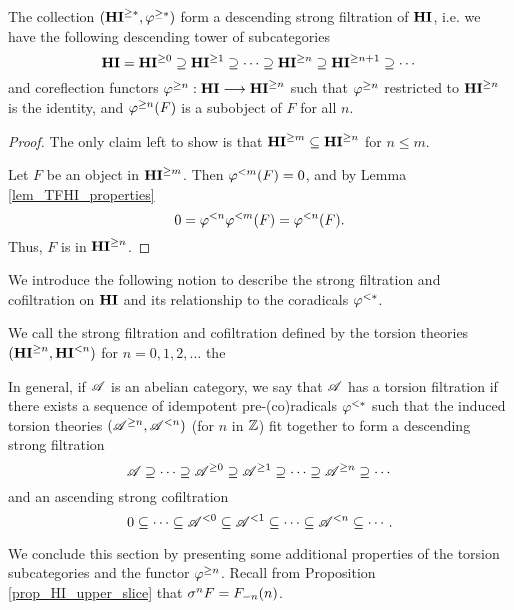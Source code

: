 \begin{prop}\label{prop_THI_form_strong_filt}
The collection $(\THI{*}, \tgHI{*})$ form a descending strong 
filtration of $\HI$, i.e. we have the following descending
tower of subcategories
\[
\HI = \THI{0} \supseteq \THI{1} \supseteq \cdots \supseteq \THI{n} \supseteq \THI{n + 1}
\supseteq \cdots
\]
and coreflection functors $\tgHI{n} : \HI \to \THI{n}$ such
that $\tgHI{n}$ restricted to $\THI{n}$ is the identity, and
$\tgHI{n}(F)$ is a subobject of $F$ for all $n$.
\end{prop}
\begin{proof}
The only claim left to show is that $\THI{m} \subseteq \THI{n}$
for $n \leq m$.

Let $F$ be an object in $\THI{m}$. Then 
$\tlHI{m}(F) = 0$, and by Lemma \ref{lem_TFHI_properties}
\[
0 = \tlHI{n}\tlHI{m}(F) = \tlHI{n}(F).
\]
Thus, $F$ is in $\THI{n}$.
\end{proof}

We introduce the following notion to describe the strong filtration
and cofiltration on $\HI$ and its relationship to the coradicals
$\tlHI{*}$.

\begin{defn}
We call the strong filtration and cofiltration defined by
the torsion theories $(\TGHI{n}{\HI}, \TLHI{n}{\HI})$ for $n = 
0,1,2,\dots$ the 

In general, if $\Cat{A}$ is an abelian category, we say that
$\Cat{A}$ has a torsion filtration if there exists a sequence
of idempotent pre-(co)radicals $\corad{*}$ such that the induced
torsion theories $(\Prerad{n}{\Cat{A}}, \Corad{n}{\Cat{A}})$ (for 
$n$ in $\Z$) fit together to form a descending strong filtration
\[
\Cat{A} \supseteq \cdots \supseteq \Prerad{0}{\Cat{A}} \supseteq
   \Prerad{1}{\Cat{A}} \supseteq \cdots \supseteq \Prerad{n}{\Cat{A}}
   \supseteq \cdots
\]
and an ascending strong cofiltration
\[
0 \subseteq \cdots \subseteq \Corad{0}{\Cat{A}} \subseteq
   \Corad{1}{\Cat{A}} \subseteq \cdots \subseteq \Corad{n}{\Cat{A}}
   \subseteq \cdots.
\]
\end{defn}

We conclude this section by presenting some additional properties of
the torsion subcategories and the functor $\tgHI{n}$. Recall from
Proposition \ref{prop_HI_upper_slice} that $\sgHI{n}F = 
\LHI[n]{\RHI[n]{F}}$.

